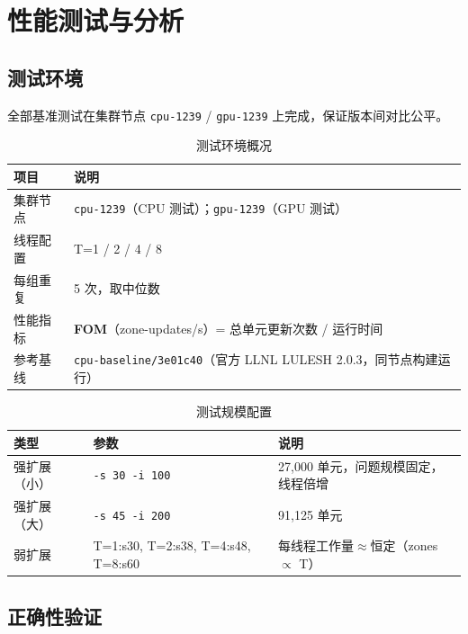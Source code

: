 \documentclass[UTF8,12pt,a4paper]{ctexart}
\begin{document}
\section{性能测试与分析}

\subsection{测试环境}

全部基准测试在集群节点 \texttt{cpu-1239} / \texttt{gpu-1239} 上完成，保证版本间对比公平。

\begin{table}[H]
\centering
\caption{测试环境概况}
\label{tab:testenv}
\begin{tabular}{ll}
\toprule
\textbf{项目} & \textbf{说明} \\
\midrule
集群节点 & \texttt{cpu-1239}（CPU 测试）；\texttt{gpu-1239}（GPU 测试） \\
线程配置 & T=1 / 2 / 4 / 8 \\
每组重复 & 5 次，取中位数 \\
性能指标 & \textbf{FOM}（zone-updates/s）= 总单元更新次数 / 运行时间 \\
参考基线 & \texttt{cpu-baseline/3e01c40}（官方 LLNL LULESH 2.0.3，同节点构建运行） \\
\bottomrule
\end{tabular}
\end{table}

\begin{table}[H]
\centering
\caption{测试规模配置}
\label{tab:testscale}
\begin{tabular}{lll}
\toprule
\textbf{类型} & \textbf{参数} & \textbf{说明} \\
\midrule
强扩展（小） & \texttt{-s 30 -i 100} & 27,000 单元，问题规模固定，线程倍增 \\
强扩展（大） & \texttt{-s 45 -i 200} & 91,125 单元 \\
弱扩展 & T=1:s30, T=2:s38, T=4:s48, T=8:s60 & 每线程工作量$\approx$恒定（zones $\propto$ T） \\
\bottomrule
\end{tabular}
\end{table}

\subsection{正确性验证}
\end{document}
